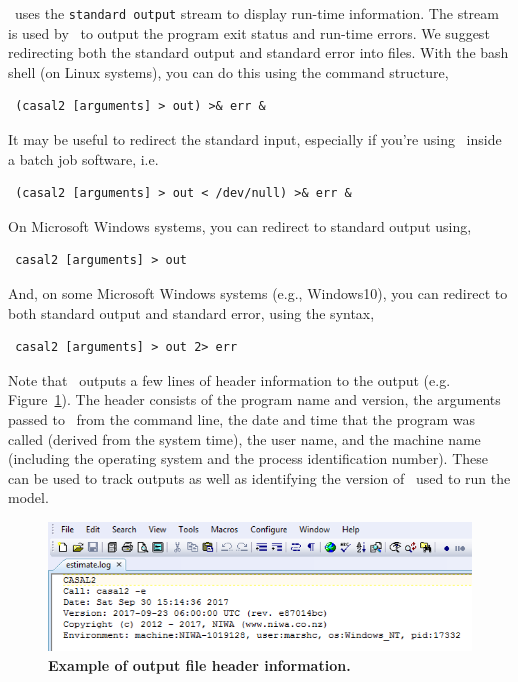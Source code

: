 \CNAME\ uses the \texttt{standard output} stream to display run-time information. The  stream is used by \CNAME\ to output the program exit status and run-time errors. We suggest redirecting both the standard output and standard error into files. With the bash shell (on Linux systems), you can do this using the command structure,

\begin{verbatim} (casal2 [arguments] > out) >& err &\end{verbatim}

It may be useful to redirect the standard input, especially if you're using \CNAME\ inside a batch job software, i.e. 

\begin{verbatim} (casal2 [arguments] > out < /dev/null) >& err &\end{verbatim}

On Microsoft Windows systems, you can redirect to standard output using,

\begin{verbatim} casal2 [arguments] > out\end{verbatim}

And, on some Microsoft Windows systems (e.g., Windows10), you can redirect to both standard output and standard error, using the syntax, 

\begin{verbatim} casal2 [arguments] > out 2> err\end{verbatim}

Note that \CNAME\ outputs a few lines of header information to the output (e.g. Figure~\ref{fig:log_file_1}). The header consists of the program name and version, the arguments passed to \CNAME\ from the command line, the date and time that the program was called (derived from the system time), the user name, and the machine name (including the operating system and the process identification number). These can be used to track outputs as well as identifying the version of \CNAME\ used to run the model.

\begin{figure}[htp]
	\includegraphics[scale=1]{Figures/eglog.png}
	\caption{\textbf{Example of output file header information.}}\label{fig:log_file_1}
\end{figure}

